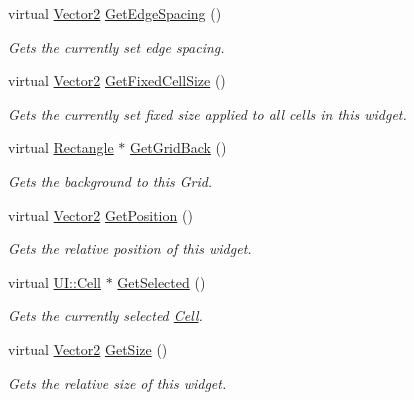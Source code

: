\begin{DoxyCompactItemize}
virtual \hyperlink{classphys_1_1Vector2}{Vector2} \hyperlink{classphys_1_1UI_1_1CellGrid_afcf2689f1cc38acb157deb8ee5717906}{GetEdgeSpacing} ()
\begin{DoxyCompactList}\small\item\em Gets the currently set edge spacing. \item\end{DoxyCompactList}\item 
virtual \hyperlink{classphys_1_1Vector2}{Vector2} \hyperlink{classphys_1_1UI_1_1CellGrid_a7106972be4c03ac453894fcb7ef4782f}{GetFixedCellSize} ()
\begin{DoxyCompactList}\small\item\em Gets the currently set fixed size applied to all cells in this widget. \item\end{DoxyCompactList}\item 
virtual \hyperlink{classphys_1_1UI_1_1Rectangle}{Rectangle} $\ast$ \hyperlink{classphys_1_1UI_1_1CellGrid_a25796d285052da2f0d833e6c8694edd1}{GetGridBack} ()
\begin{DoxyCompactList}\small\item\em Gets the background to this Grid. \item\end{DoxyCompactList}\item 
virtual \hyperlink{classphys_1_1Vector2}{Vector2} \hyperlink{classphys_1_1UI_1_1CellGrid_a6b7fcbfd8a965e69c6e3e92d474f121f}{GetPosition} ()
\begin{DoxyCompactList}\small\item\em Gets the relative position of this widget. \item\end{DoxyCompactList}\item 
virtual \hyperlink{classphys_1_1UI_1_1Cell}{UI::Cell} $\ast$ \hyperlink{classphys_1_1UI_1_1CellGrid_a4c68b88de0b02ef66ee192db430435ee}{GetSelected} ()
\begin{DoxyCompactList}\small\item\em Gets the currently selected \hyperlink{classphys_1_1UI_1_1Cell}{Cell}. \item\end{DoxyCompactList}\item 
virtual \hyperlink{classphys_1_1Vector2}{Vector2} \hyperlink{classphys_1_1UI_1_1CellGrid_aa0ad4f1e0159f8c6ca3928595dffd837}{GetSize} ()
\begin{DoxyCompactList}\small\item\em Gets the relative size of this widget. \item\end{DoxyCompactList}\item 

\end{DoxyCompactItemize}
